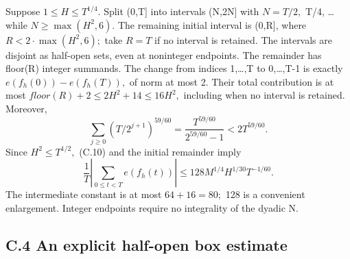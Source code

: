 \documentclass[11pt,a4paper]{article}
\begin{document}
Suppose \(1\le H\le T^{1/4}.\) Split (0,T{]} into intervals (N,2N{]}
with \(N=T/2,\) T/4, \ldots{} while \(N\ge \max(H^2,6).\) The remaining
initial interval is (0,R{]}, where \(R<2\cdot \max(H^2,6);\) take
\(R=T\) if no interval is retained. The intervals are disjoint as
half-open sets, even at noninteger endpoints. The remainder has floor(R)
integer summands. The change from indices 1,\ldots,T to 0,\ldots,T-1 is
exactly \(e(f_h(0))-e(f_h(T)),\) of norm at most 2. Their total
contribution is at most \(floor(R)+2\le 2H^2+14\le 16H^2,\) including
when no interval is retained. Moreover, \[
\sum_{j\ge0}(T/2^{j+1})^{59/60}
=\frac{T^{59/60}}{2^{59/60}-1}<2T^{59/60}.
\] Since \(H^2\le T^{1/2},\) (C.10) and the initial remainder imply \[
\frac1T\left|\sum_{0\le t<T}e(f_h(t))\right|
\le128M^{1/4}H^{1/30}T^{-1/60}. \tag{C.11}
\] The intermediate constant is at most \(64+16=80;\) 128 is a
convenient enlargement. Integer endpoints require no integrality of the
dyadic N.

\subsection{C.4 An explicit half-open box
estimate}\label{c.4-an-explicit-half-open-box-estimate}
\end{document}
